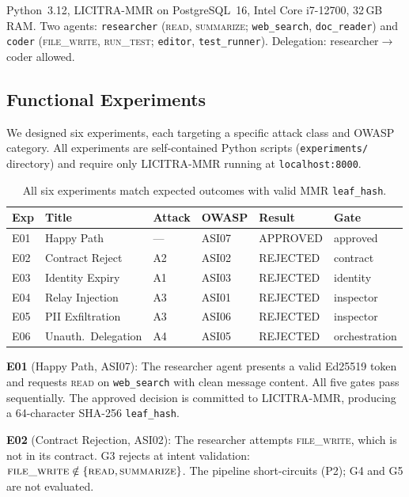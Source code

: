 \documentclass[11pt,a4paper]{article}
\begin{document}
Python~3.12, LICITRA-MMR on PostgreSQL~16, Intel Core i7-12700, 32\,GB RAM. Two agents:
\texttt{researcher} (\textsc{read}, \textsc{summarize}; \texttt{web\_search},
\texttt{doc\_reader}) and \texttt{coder} (\textsc{file\_write}, \textsc{run\_test};
\texttt{editor}, \texttt{test\_runner}). Delegation: researcher$\to$coder allowed.

\subsection{Functional Experiments}

We designed six experiments, each targeting a specific attack class and OWASP category. All
experiments are self-contained Python scripts (\texttt{experiments/} directory) and require only
LICITRA-MMR running at \texttt{localhost:8000}.

\begin{table}[ht]
\centering
\caption{All six experiments match expected outcomes with valid MMR \texttt{leaf\_hash}.}
\label{tab:experiments}
\begin{tabular}{@{}llllll@{}}
\toprule
\textbf{Exp} & \textbf{Title} & \textbf{Attack} & \textbf{OWASP} & \textbf{Result} & \textbf{Gate} \\
\midrule
E01 & Happy Path             & ---  & ASI07 & APPROVED & approved \\
E02 & Contract Reject        & A2   & ASI02 & REJECTED & contract \\
E03 & Identity Expiry        & A1   & ASI03 & REJECTED & identity \\
E04 & Relay Injection        & A3   & ASI01 & REJECTED & inspector \\
E05 & PII Exfiltration       & A3   & ASI06 & REJECTED & inspector \\
E06 & Unauth.\ Delegation   & A4   & ASI05 & REJECTED & orchestration \\
\bottomrule
\end{tabular}
\end{table}

\textbf{E01} (Happy Path, ASI07): The researcher agent presents a valid Ed25519 token and
requests \textsc{read} on \texttt{web\_search} with clean message content. All five gates pass
sequentially. The approved decision is committed to LICITRA-MMR, producing a 64-character
SHA-256 \texttt{leaf\_hash}.

\textbf{E02} (Contract Rejection, ASI02): The researcher attempts \textsc{file\_write}, which
is not in its contract. G3 rejects at intent validation:
$\textsc{file\_write} \notin \{\textsc{read}, \textsc{summarize}\}$. The pipeline
short-circuits (P2); G4 and G5 are not evaluated.
\end{document}

